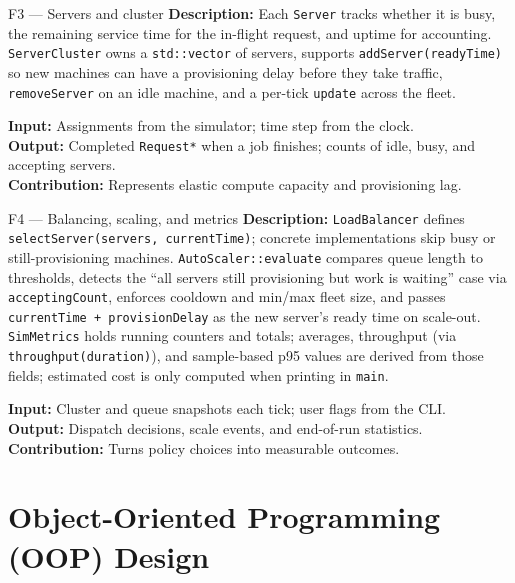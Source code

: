 \documentclass[12pt, a4paper]{article}
\newcommand{\code}[1]{\texttt{\textcolor{NUNavyL}{#1}}}
\begin{document}
\begin{funccard}{\faServer\enspace F3 — Servers and cluster}
\textbf{Description:}
Each \code{Server} tracks whether it is busy, the remaining service time for
the in-flight request, and uptime for accounting.
\code{ServerCluster} owns a \code{std::vector} of servers, supports
\code{addServer(readyTime)} so new machines can have a provisioning delay before
they take traffic, \code{removeServer} on an idle machine, and a per-tick
\code{update} across the fleet.

\medskip\noindent
\textbf{Input:}  Assignments from the simulator; time step from the clock. \\
\textbf{Output:} Completed \code{Request*} when a job finishes; counts of idle,
busy, and accepting servers. \\
\textbf{Contribution:} Represents elastic compute capacity and provisioning lag.
\end{funccard}

\begin{funccard}{\faBalanceScale\enspace F4 — Balancing, scaling, and metrics}
\textbf{Description:}
\code{LoadBalancer} defines \code{selectServer(servers, currentTime)}; concrete
implementations skip busy or still-provisioning machines.
\code{AutoScaler::evaluate} compares queue length to thresholds, detects the
``all servers still provisioning but work is waiting'' case via
\code{acceptingCount}, enforces cooldown and min/max fleet size, and passes
\code{currentTime + provisionDelay} as the new server's ready time on scale-out.
\code{SimMetrics} holds running counters and totals; averages, throughput (via
\code{throughput(duration)}), and sample-based p95 values are derived from those
fields; estimated cost is only computed when printing in \texttt{main}.

\medskip\noindent
\textbf{Input:}  Cluster and queue snapshots each tick; user flags from the CLI. \\
\textbf{Output:} Dispatch decisions, scale events, and end-of-run statistics. \\
\textbf{Contribution:} Turns policy choices into measurable outcomes.
\end{funccard}

\section{Object-Oriented Programming (OOP) Design}
\end{document}
